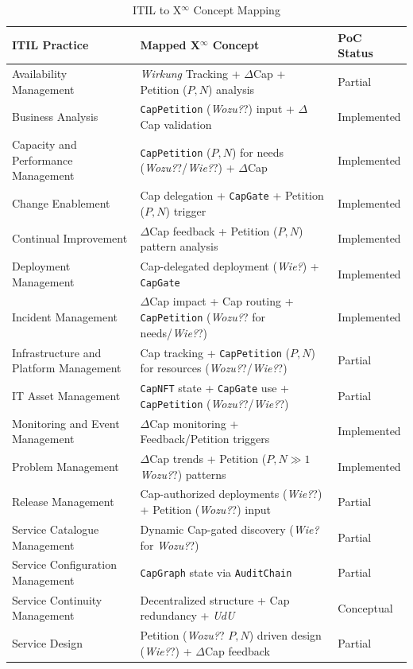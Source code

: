 \documentclass[12pt, a4paper]{scrartcl}
\newcommand{\Xinf}{X$^\infty$}                        %
\newcommand{\DeltaCap}{$\Delta$Cap}                    %
\newcommand{\Wirkung}{\textit{Wirkung}}                 %
\newcommand{\CapNFT}{\texttt{CapNFT}}
\newcommand{\CapGate}{\texttt{CapGate}}
\newcommand{\AuditChain}{\texttt{AuditChain}}
\newcommand{\CapPetition}{\texttt{CapPetition}}        %
\newcommand{\UdU}{\textit{UdU}} %
\newcommand{\Wozu}{\textit{Wozu?}}                      %
\newcommand{\Wie}{\textit{Wie?}}                        %
\begin{document}
\begin{landscape}
\begin{table}[htbp]
\centering
\caption{ITIL to \Xinf{} Concept Mapping}
\label{tab:itil_mapping}
{\footnotesize
\begin{tabular}{@{}lll@{}} %
\toprule
\textbf{ITIL Practice} & \textbf{Mapped \Xinf{} Concept} & \textbf{PoC Status} \\
\midrule
Availability Management & \Wirkung{} Tracking + \DeltaCap{} + Petition ($P,N$) analysis & Partial \\
Business Analysis & \CapPetition{} (\Wozu?) input + \DeltaCap{} validation & Implemented \\
Capacity and Performance Management & \CapPetition{} ($P,N$) for needs (\Wozu?/\Wie?) + \DeltaCap{} & Implemented \\
Change Enablement & Cap delegation + \CapGate{} + Petition ($P,N$) trigger & Implemented \\
Continual Improvement & \DeltaCap{} feedback + Petition ($P,N$) pattern analysis & Implemented \\
Deployment Management & Cap-delegated deployment (\Wie{}) + \CapGate{} & Implemented \\
Incident Management & \DeltaCap{} impact + Cap routing + \CapPetition{} (\Wozu? for needs/\Wie?) & Implemented \\
Infrastructure and Platform Management & Cap tracking + \CapPetition{} ($P,N$) for resources (\Wozu?/\Wie?) & Partial \\
IT Asset Management & \CapNFT{} state + \CapGate{} use + \CapPetition{} (\Wozu?/\Wie?) & Partial \\
Monitoring and Event Management & \DeltaCap{} monitoring + Feedback/Petition triggers & Implemented \\
Problem Management & \DeltaCap{} trends + Petition ($P,N \gg 1$ \Wozu?) patterns & Implemented \\
Release Management & Cap-authorized deployments (\Wie?) + Petition (\Wozu?) input & Partial \\
Service Catalogue Management & Dynamic Cap-gated discovery (\Wie{} for \Wozu?) & Partial \\
Service Configuration Management & \texttt{CapGraph} state via \AuditChain{} & Partial \\
Service Continuity Management & Decentralized structure + Cap redundancy + \UdU{} & Conceptual \\
Service Design & Petition (\Wozu? $P,N$) driven design (\Wie?) + \DeltaCap{} feedback & Partial \\

\end{tabular}}
\end{table}
\end{landscape}
\end{document}
